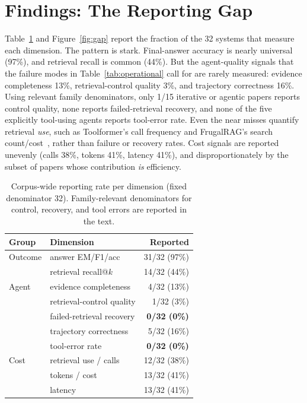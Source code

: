 \documentclass[11pt]{article}
\begin{document}
\section{Findings: The Reporting Gap}
\label{sec:findings}
Table~\ref{tab:findings} and Figure~\ref{fig:gap} report the fraction of the 32 systems that measure
each dimension. The pattern is stark. Final-answer accuracy is nearly universal (97\%), and retrieval
recall is common (44\%). But the agent-quality signals that the failure modes in
Table~\ref{tab:operational} call for are rarely measured: evidence completeness 13\%, retrieval-control
quality 3\%, and trajectory correctness 16\%. Using relevant family denominators, only 1/15 iterative
or agentic papers reports control quality, none reports failed-retrieval recovery, and none of the five
explicitly tool-using agents reports tool-error rate. Even the near misses quantify retrieval
\emph{use}, such as Toolformer's call frequency and FrugalRAG's search count/cost~\citep{toolformer,frugalrag},
rather than failure or recovery rates. Cost signals are reported unevenly (calls 38\%, tokens 41\%, latency 41\%),
and disproportionately by the subset of papers whose contribution
\emph{is} efficiency.

\begin{table}[t]\centering\small
\caption{Corpus-wide reporting rate per dimension (fixed denominator 32). Family-relevant denominators
for control, recovery, and tool errors are reported in the text.}
\label{tab:findings}
\begin{tabular}{@{}llr@{}}
\toprule
\textbf{Group} & \textbf{Dimension} & \textbf{Reported} \\
\midrule
Outcome & answer EM/F1/acc & 31/32 (97\%) \\
 & retrieval recall@$k$ & 14/32 (44\%) \\
\midrule
Agent & evidence completeness & 4/32 (13\%) \\
 & retrieval-control quality & 1/32 (3\%) \\
 & failed-retrieval recovery & \textbf{0/32 (0\%)} \\
 & trajectory correctness & 5/32 (16\%) \\
 & tool-error rate & \textbf{0/32 (0\%)} \\
\midrule
Cost & retrieval use / calls & 12/32 (38\%) \\
 & tokens / cost & 13/32 (41\%) \\
 & latency & 13/32 (41\%) \\
\bottomrule
\end{tabular}
\end{table}
\end{document}
